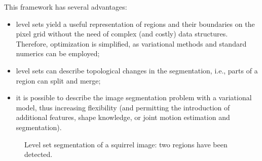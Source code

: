 This framework has several advantages:
\begin{itemize}
\item level sets yield a useful representation of regions and their boundaries on the pixel grid without the need of complex (and costly) data structures. Therefore, optimization is simplified, as variational methods and standard numerics can be employed;

\item level sets can describe topological changes in the segmentation, i.e., parts of a region can split and merge;

\item it is possible to describe the image segmentation problem with a variational model, thus increasing flexibility (and permitting the introduction of additional features, shape knowledge, or joint motion estimation and segmentation).
\end{itemize}

\begin{figure}
\centering
{} \quad
\caption[Level set segmentation]{Level set segmentation of a squirrel image: two regions have been detected.}
\label{fig:squirrel_ls}
\end{figure}


